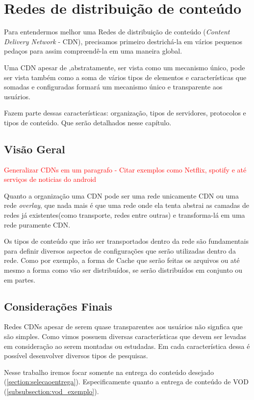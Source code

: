 \chapter{Redes de distribuição de conteúdo}
\label{sec:composicao}

Para entendermos melhor uma Redes de distribuição de conteúdo (\emph{Content Delivery Network} - CDN), precisamos primeiro destrich\'a-la em v\'arios pequenos peda\c{c}os para assim compreendê-la em uma maneira global.

Uma CDN apesar de ,abstratamente, ser vista como um mecanismo \'unico, pode ser vista tamb\'em como a soma de v\'arios tipos de elementos e caracter\'isticas que somadas e configuradas formar\'a um mecanismo \'unico e transparente aos usu\'arios.

Fazem parte dessas caracter\'isticas: organiza\c{c}\~ao, tipos de servidores, protocolos e tipos de conte\'udo. Que serão detalhados nesse capítulo.

\section{Visão Geral}

\textcolor{red}{Generalizar CDNs em um paragrafo - Citar exemplos como Netflix, spotify e até serviços de noticias do android}

Quanto a organiza\c{c}\~ao uma CDN pode ser uma rede unicamente CDN ou uma rede \textit{overlay}, que nada mais \'e que uma rede onde ela tenta abstrai as camadas de redes j\'a existentes(como transporte, redes entre outras) e transforma-l\'a em uma rede puramente CDN.

Os tipos de conte\'udo que ir\~ao ser transportados dentro da rede s\~ao fundamentais para definir diversos aspectos de configura\c{c}\~oes que ser\~ao utilizadas dentro da rede. Como por exemplo, a forma de Cache que ser\~ao feitas os arquivos ou at\'e mesmo a forma como v\~ao ser distribu\'idos, se ser\~ao distribu\'idos em conjunto ou em partes. 





\section{Considerações Finais}

Redes CDNs apesar de serem quase transparentes aos usuários não signfica que são simples. Como vimos possuem diversas características que devem ser levadas em consideração ao serem montadas ou estudadas. Em cada característica dessa é possível desenvolver diversos tipos de pesquisas.

Nesse trabalho iremos focar somente na entrega do conteúdo desejado (\ref{section:selecaoentrega}). Especificamente quanto a entrega de conteúdo de VOD (\ref{subsubsection:vod_exemplo}).